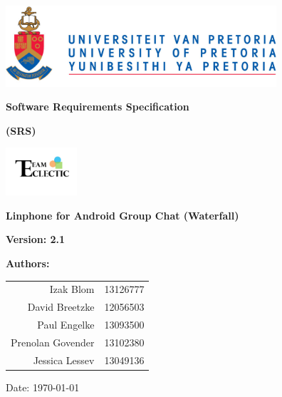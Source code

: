 \begin{titlepage}
\begin{flushright}

\includegraphics[width=380px]{../global/University_of_Pretoria_Logo.png}
\newline
\newline

\textbf {\LARGE Software Requirements Specification} \newline

\textbf {\Large (SRS)}\newline

\centering\includegraphics[width=100px]{../global/Logo.jpg}

\textbf {\Large Linphone for Android Group Chat (Waterfall)}\newline

\flushright \textbf {\large Version: 2.1}\newline

\centering \textbf {\large Authors:}

\begin{table}[H]
\large
\centering
\begin{tabular}{rl}
	Izak Blom & 13126777 \\
	David Breetzke & 12056503 \\
	Paul Engelke & 13093500 \\
	Prenolan Govender & 13102380 \\
	Jessica Lessev & 13049136 \\
\end{tabular}
\end{table}

Date: \today

\end{flushright}
\end{titlepage}